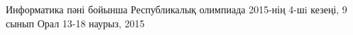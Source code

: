 \documentclass [11pt, a4paper, oneside] {article}
\begin{document}
\contest
{Информатика пәні бойынша Республикалық олимпиада 2015-нің 4-шi кезеңі, 9 сынып}%
{Орал}%
{13-18 наурыз, 2015}%


\renewcommand{\t}{\texttt}
\end{document}
